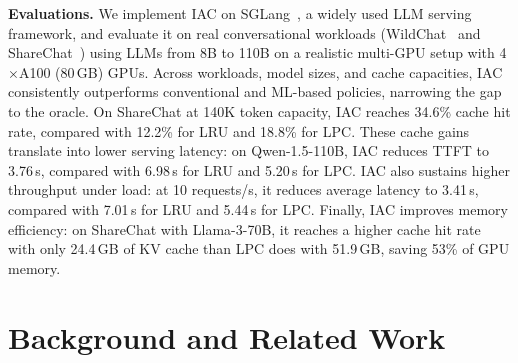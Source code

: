 \documentclass{article}
\newcommand{\jiny}[1]{\textcolor{orange}{[Jiny: #1]}}
\newcommand{\bo}[1]{\textcolor{red}{[Bo: #1]}}
\begin{document}
\textbf{Evaluations.} We implement IAC on SGLang~\cite{sglang}, a widely used LLM serving framework, and evaluate it on real conversational workloads (WildChat~\cite{zhao2024wildchat} and ShareChat~\cite{yan2025sharechat}) using LLMs from 8B to 110B on a realistic multi-GPU setup with 4$\times$A100 (80\,GB) GPUs. Across workloads, model sizes, and cache capacities, IAC consistently outperforms conventional and ML-based policies, narrowing the gap to the oracle. On ShareChat at 140K token capacity, IAC reaches 34.6\% cache hit rate, compared with 12.2\% for LRU and 18.8\% for LPC. These cache gains translate into lower serving latency: on Qwen-1.5-110B, IAC reduces TTFT to 3.76\,s, compared with 6.98\,s for LRU and 5.20\,s for LPC. IAC also sustains higher throughput under load: at 10 requests/s, it reduces average latency to 3.41\,s, compared with 7.01\,s for LRU and 5.44\,s for LPC. Finally, IAC improves memory efficiency: on ShareChat with Llama-3-70B, it reaches a higher cache hit rate with only 24.4\,GB of KV cache than LPC does with 51.9\,GB, saving 53\% of GPU memory. 





\vspace{-10pt}
\section{Background and Related Work}
\vspace{-7pt}
\end{document}
